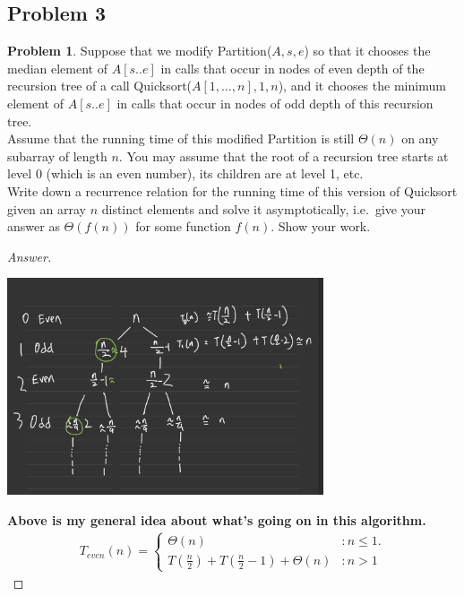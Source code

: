 \documentclass[11pt]{article}
\theoremstyle{definition}
\theoremstyle{definition}
\newtheorem{required}{Problem}
\theoremstyle{definition}
\begin{document}
\subsection{Problem 3}
\begin{required}

Suppose that we modify {\sc Partition}($A,s,e$) so that it chooses the median element of $A[s..e]$ in calls that occur in nodes of even depth of the recursion tree of a call {\sc Quicksort}($A[1, \ldots, n],1, n$), and it chooses the minimum element of $A[s..e]$ in calls that occur in nodes of odd depth of this recursion tree. \\
  
\noindent Assume that the running time of this modified {\sc Partition} is still $\Theta(n)$ on any subarray of length $n$. You may assume that the root of a recursion tree starts at level $0$ (which is an even number), its children are at level 1, etc. \\
  
\noindent Write down a recurrence relation for the running time of this version of {\sc Quicksort} given an array $n$ distinct elements and solve it asymptotically, i.e.\ give your answer as $\Theta(f(n))$ for some function $f(n)$. Show your work.

\begin{proof}[Answer]
\begin{center}
\includegraphics[width=0.7\textwidth]{HW6_Q3.PNG}
\end{center}

\textbf{ Above is my general idea about what's going on in this algorithm.\\}
\begin{align*}
T_{even}(n) = \begin{cases}
\Theta(n)& : n \leq 1.\\
T(\frac{n}{2}) + T(\frac{n}{2}-1) +\Theta(n)& : n > 1 
\end{cases}
\end{align*}


\end{proof}
\end{required}
\end{document}
